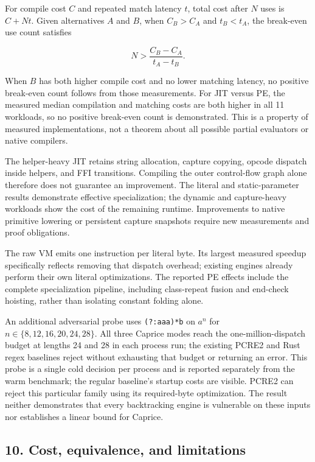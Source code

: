 \documentclass[
  11pt,
]{article}
\begin{document}
For compile cost \(C\) and repeated match latency \(t\), total cost
after \(N\) uses is \(C+Nt\). Given alternatives \(A\) and \(B\), when
\(C_B>C_A\) and \(t_B<t_A\), the break-even use count satisfies

\[ N>\frac{C_B-C_A}{t_A-t_B}. \]

When \(B\) has both higher compile cost and no lower matching latency,
no positive break-even count follows from those measurements. For JIT
versus PE, the measured median compilation and matching costs are both
higher in all 11 workloads, so no positive break-even count is
demonstrated. This is a property of measured implementations, not a
theorem about all possible partial evaluators or native compilers.

The helper-heavy JIT retains string allocation, capture copying, opcode
dispatch inside helpers, and FFI transitions. Compiling the outer
control-flow graph alone therefore does not guarantee an improvement.
The literal and static-parameter results demonstrate effective
specialization; the dynamic and capture-heavy workloads show the cost of
the remaining runtime. Improvements to native primitive lowering or
persistent capture snapshots require new measurements and proof
obligations.

The raw VM emits one instruction per literal byte. Its largest measured
speedup specifically reflects removing that dispatch overhead; existing
engines already perform their own literal optimizations. The reported PE
effects include the complete specialization pipeline, including
class-repeat fusion and end-check hoisting, rather than isolating
constant folding alone.

An additional adversarial probe uses \texttt{(?:a\textbar{}aa)*b} on
\(a^n\) for \(n\in\{8,12,16,20,24,28\}\). All three Caprice modes reach
the one-million-dispatch budget at lengths 24 and 28 in each process
run; the existing PCRE2 and Rust regex baselines reject without
exhausting that budget or returning an error. This probe is a single
cold decision per process and is reported separately from the warm
benchmark; the regular baseline's startup costs are visible. PCRE2 can
reject this particular family using its required-byte optimization. The
result neither demonstrates that every backtracking engine is vulnerable
on these inputs nor establishes a linear bound for Caprice.

\hypertarget{cost-equivalence-and-limitations}{%
\subsection{10. Cost, equivalence, and
limitations}\label{cost-equivalence-and-limitations}}
\end{document}
